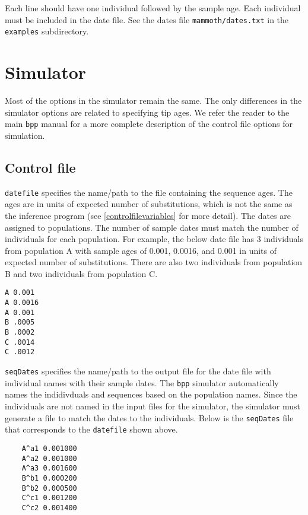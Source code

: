 \documentclass[11pt]{article}
\begin{document}
Each line should have one individual followed by the sample age.
Each individual must be included in the date file.
See the dates file \texttt{mammoth/dates.txt} in the \texttt{examples} subdirectory.


\section{Simulator}
Most of the options in the simulator remain the same. The only differences in the simulator options are related to specifying tip ages. 
We refer the reader to the main \texttt{bpp} manual for a more complete description of the control file options for simulation. 

\subsection{Control file} 
\texttt{datefile} specifies the name/path to the file containing the sequence ages. 
The ages are in units of expected number of substitutions, which is not the same as the inference program (see \ref{controlfilevariables} for more detail). 
The dates are assigned to populations.
The number of sample dates must match the number of individuals for each population.
For example, the below date file has 3 individuals from population A with sample ages of 0.001, 0.0016, and 0.001 in units of expected number of substitutions.
There are also two individuals from population B and two individuals from population C.
\begin{verbatim}
A 0.001
A 0.0016
A 0.001
B .0005
B .0002
C .0014
C .0012
\end{verbatim}
\texttt{seqDates} specifies the name/path to the output file for the date file with individual names with their sample dates.
The \texttt{bpp} simulator automatically names the indidivduals and sequences based on the population names. 
Since the individuals are not named in the input files for the simulator, the simulator must generate a file to match the dates to the individuals. Below is the \texttt{seqDates} file that corresponds to the \texttt{datefile} shown above.
\begin{verbatim}
	A^a1 0.001000
	A^a2 0.001000
	A^a3 0.001600
	B^b1 0.000200
	B^b2 0.000500
	C^c1 0.001200
	C^c2 0.001400
\end{verbatim}
\end{document}
